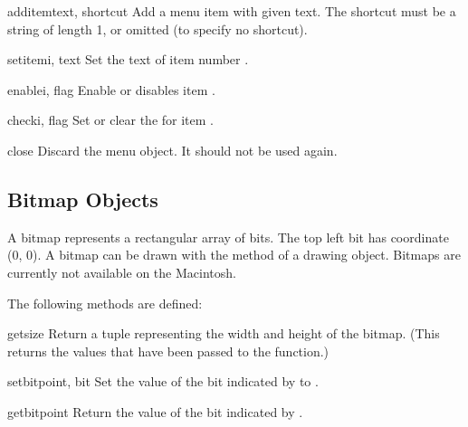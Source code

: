 
\begin{funcdesc}{additem}{text, shortcut}
Add a menu item with given text.
The shortcut must be a string of length 1, or omitted (to specify no
shortcut).
\end{funcdesc}

\begin{funcdesc}{setitem}{i, text}
Set the text of item number
.
\end{funcdesc}

\begin{funcdesc}{enable}{i, flag}
Enable or disables item
.
\end{funcdesc}

\begin{funcdesc}{check}{i, flag}
Set or clear the
for item
.
\end{funcdesc}

\begin{funcdesc}{close}{}
Discard the menu object.  It should not be used again.
\end{funcdesc}

\subsection{Bitmap Objects}

A bitmap represents a rectangular array of bits.
The top left bit has coordinate (0, 0).
A bitmap can be drawn with the  method of a drawing object.
Bitmaps are currently not available on the Macintosh.

The following methods are defined:


\begin{funcdesc}{getsize}{}
Return a tuple representing the width and height of the bitmap.
(This returns the values that have been passed to the 
function.)
\end{funcdesc}

\begin{funcdesc}{setbit}{point, bit}
Set the value of the bit indicated by  to .
\end{funcdesc}

\begin{funcdesc}{getbit}{point}
Return the value of the bit indicated by .
\end{funcdesc}

